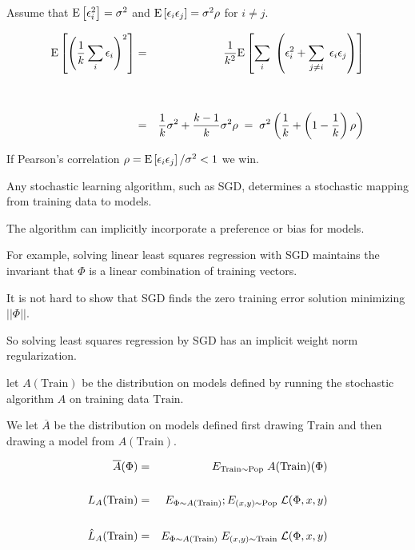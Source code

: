 {{

Assume that $\mathrm{E}\left[\epsilon_i ^2\right] = \sigma^2$ and $\mathrm{E}\left[\epsilon_i \epsilon_j\right] = \sigma^2\rho$ for $i \not = j$.

\begin{eqnarray*}
  \mathrm{E}\left[\left(\frac{1}{k} \sum_i \epsilon_i\right)^2\right] & = & \frac{1}{k^2} \mathrm{E}\left[\sum_i\;\left(\epsilon_i^2 + \sum_{j \not = i}\;\epsilon_i\epsilon_j\right)\right] \\
  \\
  \\
  & = & \frac{1}{k} \sigma^2 + \frac{k-1}{k} \sigma^2\rho \;=\; \sigma^2\left(\frac{1}{k} + \left(1-\frac{1}{k}\right)\rho\right)
\end{eqnarray*}

\vfill
If Pearson's correlation $\rho = \mathrm{E}\left[\epsilon_i\epsilon_j\right]/\sigma^2 < 1$ we win.
}



Any stochastic learning algorithm, such as SGD, determines a stochastic mapping from training data to models.

\vfill
The algorithm can implicitly incorporate a preference or bias for models.

\vfill
For example, solving linear least squares regression with SGD maintains the invariant that $\Phi$ is a linear combination of training vectors.

\vfill
It is not hard to show that SGD finds the zero training error solution minimizing $||\Phi||$.

\vfill
So solving least squares regression by SGD has an implicit weight norm regularization.


let $A(\mathrm{Train})$ be the distribution on models defined by running the stochastic algorithm $A$ on training data
$\mathrm{Train}$.

\vfill
We let $\overline{A}$ be the distribution on models defined first drawing $\mathrm{Train}$ and then drawing a model from $A(\mathrm{Train})$.

\begin{eqnarray*}
\overline{A}(\Phi) & = & E_{\mathrm{Train} \sim \mathrm{Pop}}\;A(\mathrm{Train})(\Phi) \\
\\
L_A(\mathrm{Train}) & = & E_{\Phi \sim A(\mathrm{Train})};E_{(x,y) \sim \mathrm{Pop}}\;{\cal L}(\Phi,x,y) \\
\\
\hat{L}_A(\mathrm{Train}) & = & E_{\Phi \sim A(\mathrm{Train})}\;E_{(x,y) \sim \mathrm{\mathrm{Train}}}\;{\cal L}(\Phi,x,y)
\end{eqnarray*}

}
